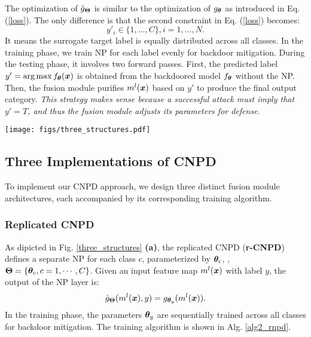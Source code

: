 The optimization of $\hat{g}_{\bm{\Theta}}$ is similar to the optimization of $g_{\bm{\theta}}$ as introduced in Eq. (\ref{loss}). The only difference is that the second constraint in Eq. (\ref{loss}) becomes:
\begin{equation}
    y'_i \in \{1,\ldots,C\},i = 1,\ldots,N.
\end{equation}
It means the surrogate target label is equally distributed across all classes.
In the training phase, we train NP for each label evenly for backdoor mitigation. 
During the testing phase, it involves two forward passes. First, the predicted label $y'=\operatorname*{arg\,max} f_{\bm{\theta}}(\bm{x})$ is obtained from the backdoored model $f_{\bm{\theta}}$ without the NP. Then, the fusion module purifies $m^{l}(\bm{x})$ based on $y'$ to produce the final output category.
\textit{This strategy makes sense because a successful attack must imply that $y'=T$, and thus the fusion module adjusts its parameters for defense.}


\begin{figure*}
\centering
\vspace{0.5em}
\texttt{[image: figs/three\_structures.pdf]}
\caption{
\textbf{(a)}. Replicated CNPD: Each class is associated with an individual neural polarizer.
\textbf{(b)}. Embedding-based CNPD: Class information is embedded as features within the model.
\textbf{(c)}. Attention-based CNPD: Class information is used to guide the network's attention for purification.
}
\label{three_structures}
\end{figure*}
\subsection{Three Implementations of CNPD\label{sec3.4}}
To implement our CNPD approach, we design three distinct fusion module architectures, each accompanied by its corresponding training algorithm.

\subsubsection{Replicated CNPD\label{sec3.4.1}}
As dipicted in Fig. \ref{three_structures} \textbf{(a)}, the replicated CNPD (\textbf{r-CNPD}) defines a separate NP for each class $c$, parameterized by $\bm{\theta}_c$, \ie, $\bm{\Theta}=\{\bm{\theta}_c,c=1,\cdots,C\}$. Given an input feature map $m^{l}(\bm{x})$ with label $y$, the output of the NP layer is:
\begin{equation}
    \hat{g}_{\bm{\Theta}}(m^{l}(\bm{x}),y) = g_{\bm{\theta}_y}(m^{l}(\bm{x})).
\end{equation}
In the training phase, the parameters $\bm{\theta}_y$ are sequentially trained across all classes for backdoor mitigation. The training algorithm is shown in Alg. \ref{alg2_rnpd}.

